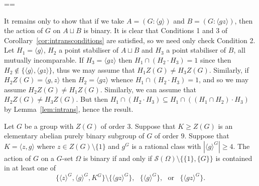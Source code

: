 \documentclass[11pt, a4paper]{amsart}
\makeatletter
\renewcommand{\proofname}{Proof}
\renewenvironment{proof}[1][\proofname]{\par
  \pushQED{\qed}  \normalfont \partopsep=\z@skip \topsep=\z@skip
  \trivlist
  \item[\hskip\labelsep
        \scshape
    #1\@addpunct{.}]\ignorespaces
}{  \popQED\endtrivlist\@endpefalse
}
\makeatother
\begin{document}
\begin{proof}
It remains only to show that if we take $A=(G:\langle g\rangle)$ and $B=(G : \langle gz\rangle )$, then the action of $G$ on $A\sqcup B$ is binary. It is clear that Conditions 1 and 3 of Corollary~\ref{cor:intransconditions} are satisfied, so we need only check Condition 2. Let $H_1=\langle g\rangle$, $H_2$ a point stabiliser of $A\sqcup B$ and $H_3$ a point stabiliser of $B$, all mutually incomparable. If $H_3=\langle gz\rangle$ then $H_1\cap(H_2\cdot H_3)=1$ since then $H_2\not\in\{\langle g\rangle,\langle gz\rangle\}$, thus we may assume that $H_1Z(G)\ne H_3Z(G)$. Similarly, if $H_2Z(G)=\langle g,z\rangle$ then $H_2=\langle gz\rangle$ whence $H_1\cap(H_2\cdot H_3)=1$, and so we may assume $H_2Z(G)\ne H_1 Z(G)$. Similarly, we can assume that $H_2Z(G)\ne H_3Z(G)$. But then $H_1\cap(H_2\cdot H_3)\subseteq H_1\cap ((H_1\cap H_2)\cdot H_3)$ by Lemma~\ref{lem:intrans}, hence the result.
                                   \end{proof}
\begin{lemma}\label{lem:p^2intrans3}
    Let $G$ be a group with $Z(G)$ of order $3$. Suppose that $K\geq Z(G)$ is an elementary abelian purely binary subgroup of $G$ of order $9$. Suppose that $K=\langle z,g\rangle$ where $z\in Z(G)\setminus\{1\}$ and $g^G$ is a rational class with $|\langle g\rangle^G|\geq 4$. The action of $G$ on a $G$-set $\Omega$ is binary if and only if $\mathcal{S}(\Omega)\setminus\{\{1\},\{G\}\}$ is contained in at least one of
      $$\{\langle z\rangle^G,\langle g\rangle^G,K^G\}\setminus\{\langle gz\rangle^G\},\,\,\,\,\{\langle g\rangle^G\},\,\,\text{ or }\,\,\, \{\langle gz\rangle^G\}.$$    \end{lemma}
\end{document}
